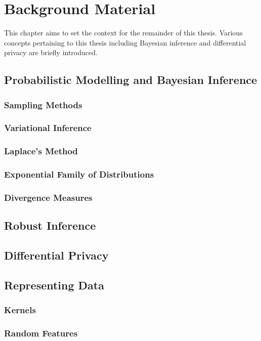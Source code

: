 \chapter{Background Material}
\label{chap:chap2}

This chapter aims to set the context for the remainder of this thesis. Various concepts pertaining to this thesis including Bayesian inference and differential privacy are briefly introduced.

\section{Probabilistic Modelling and Bayesian Inference}
\label{sec:b-bayesian-inference}

\subsection{Sampling Methods}
\label{subsec:b-sampling-methods}

\subsection{Variational Inference}
\label{subsec:b-variational-inference}

\subsection{Laplace's Method}
\label{subsec:b-laplace-method}

\subsection{Exponential Family of Distributions}
\label{subsec:b-expfam}

\subsection{Divergence Measures}
\label{subsec:b-divergences}

\section{Robust Inference}
\label{sec:b-robust-inference}

\section{Differential Privacy}
\label{sec:b-differential-privacy}

\section{Representing Data}
\label{sec:b-representing-data}

\subsection{Kernels}
\label{subsec:b-kernels}

\subsection{Random Features}
\label{subsec:b-random-features}






